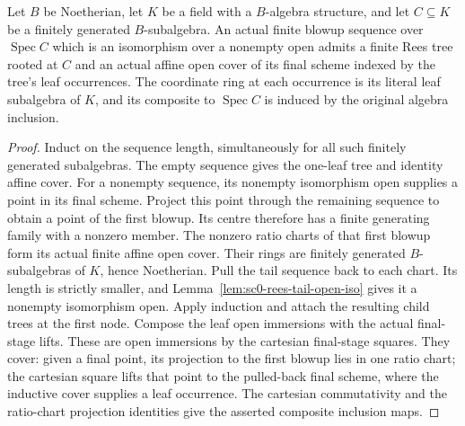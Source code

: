 \begin{theorem}\label{thm:sc0-actual-sequence-rees-cover}
\leanok
{}
Let $B$ be Noetherian, let $K$ be a field with a $B$-algebra structure, and let
$C\subseteq K$ be a finitely generated $B$-subalgebra. An actual finite blowup
sequence over $\operatorname{Spec}C$ which is an isomorphism over a nonempty open
admits a finite Rees tree rooted at $C$ and an actual affine open cover of its
final scheme indexed by the tree's leaf occurrences. The coordinate ring at each
occurrence is its literal leaf subalgebra of $K$, and its composite to
$\operatorname{Spec}C$ is induced by the original algebra inclusion.
\end{theorem}
\begin{proof}
Induct on the sequence length, simultaneously for all such finitely generated
subalgebras. The empty sequence gives the one-leaf tree and identity affine cover.
For a nonempty sequence, its nonempty isomorphism open supplies a point in its
final scheme. Project this point through the remaining sequence to obtain a point
of the first blowup. Its centre therefore has a finite generating family with
a nonzero member. The nonzero ratio charts of that first blowup form its actual
finite affine open cover. Their rings are finitely generated $B$-subalgebras of
$K$, hence Noetherian. Pull the tail sequence back to each chart. Its length is
strictly smaller, and Lemma~\ref{lem:sc0-rees-tail-open-iso} gives it a nonempty
isomorphism open. Apply induction and attach the resulting child trees at the
first node. Compose the leaf open immersions with the actual final-stage lifts.
These are open immersions by the cartesian final-stage squares. They cover:
given a final point, its projection to the first blowup lies in one ratio chart;
the cartesian square lifts that point to the pulled-back final scheme, where the
inductive cover supplies a leaf occurrence. The cartesian commutativity and the
ratio-chart projection identities give the asserted composite inclusion maps.
\end{proof}
